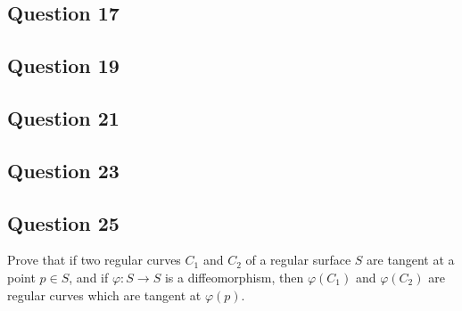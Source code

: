 \documentclass[12pt]{article}
\begin{document}
\subsection*{Question 17}

\subsection*{Question 19}

\subsection*{Question 21}

\subsection*{Question 23}

\subsection*{Question 25}
Prove that if two regular curves $C_1$ and $C_2$ of a regular surface $S$ are tangent at a point $p \in S$, and if $\varphi: S \to S$ is a diffeomorphism, then $\varphi(C_1)$ and $\varphi(C_2)$ are regular curves which are tangent at $\varphi(p)$.\\
\end{document}
